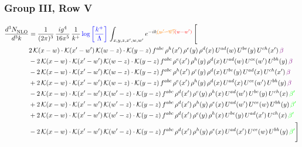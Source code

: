 \documentclass[9pt]{article}
\numberwithin{equation}{section}
\begin{document}
\subsubsection{Group III, Row V}     
\begin{align}
     \frac{d^{3}N_{\rm NLO}^{\rm}}{d^{3}k}  & = \frac{1}{(2\pi)^{3}}\, \frac{ig^{4}}{16\pi^{5}}\, \frac{1}{k^{+}}\, {\color{blue}\log{\left[\frac{k^{+}}{\Lambda}\right]}}\,\int_{x,y,z,x^{\prime},w,w^{\prime}}e^{-ik{\color{orange}\cancel{(w^{\prime}-w)}}{\color{red}(w-w^{\prime})}}\, \Bigg[\notag \\ & 2\,\mathcal{K}(x-w)\cdot\mathcal{K}(x'-w')\,\mathcal{K}(w-z)\cdot\mathcal{K}(y-z)\, f^{abc}\,\rho^{h}(x')\,\rho^{e}(y)\,\rho^{d}(x)\,U^{ad}(w)\,U^{be}(y)\,U^{ch}(x')\,{\color{violet}\beta}\notag\\ &-2\,\mathcal{K}(x-w)\cdot\mathcal{K}(x'-w')\,\mathcal{K}(w-z)\cdot\mathcal{K}(y-z)\, f^{abc}\,\rho^{e}(x')\,\rho^{h}(y)\,\rho^{d}(x)\,U^{ad}(w)\,U^{ce}(w')\,U^{bh}(y)\,{\color{violet}\beta} \notag\\ & -2\,\mathcal{K}(x-w)\cdot\mathcal{K}(x'-w')\,\mathcal{K}(w-z)\cdot\mathcal{K}(y-z)\, f^{abc}\,\rho^{h}(x')\,\rho^{e}(y)\,\rho^{d}(x)\,U^{be}(y)\,U^{ad}(x)\,U^{ch}(x')\,{\color{violet}\beta} \notag\\ &+2\,\mathcal{K}(x-w)\cdot\mathcal{K}(x'-w')\,\mathcal{K}(w-z)\cdot\mathcal{K}(y-z)\, f^{abc}\,\rho^{e}(x')\,\rho^{h}(y)\,\rho^{d}(x)\,U^{ad}(x)\,U^{ce}(w')\,U^{bh}(y)\,{\color{violet}\beta}\notag \\ & -2\, \mathcal{K}(x-w) \cdot \mathcal{K}(x'-w')\, \mathcal{K}(w'-z) \cdot \mathcal{K}(y-z)\, f^{abc}\, \rho^{d}(x')\,\rho^{e}(y)\, \rho^{h}(x)\,U^{ad}(w')\,U^{be}(y)\,U^{ch}(x)\, {\color{green} \beta'}\notag \\ & + 2\, \mathcal{K}(x-w) \cdot \mathcal{K}(x'-w')\, \mathcal{K}(w'-z) \cdot \mathcal{K}(y-z)\, f^{abc}\, \rho^{d}(x')\,\rho^{h}(y)\, \rho^{e}(x)\,U^{ad}(w')\,U^{ce}(w)\,U^{bh}(y)\, {\color{green} \beta'}\notag \\ & +2\, \mathcal{K}(x-w) \cdot \mathcal{K}(x'-w')\, \mathcal{K}(w'-z) \cdot \mathcal{K}(y-z)\, f^{abc}\, \rho^{d}(x')\,\rho^{e}(y)\, \rho^{h}(x)\,U^{be}(y)\,U^{ad}(x')\,U^{ch}(x)\, {\color{green} \beta'}\notag \\ & -2\, \mathcal{K}(x-w) \cdot \mathcal{K}(x'-w')\, \mathcal{K}(w'-z) \cdot \mathcal{K}(y-z)\, f^{abc}\, \rho^{d}(x')\,\rho^{h}(y)\, \rho^{e}(x)\,U^{ad}(x')\,U^{ce}(w)\,U^{bh}(y)\, {\color{green} \beta'}\Bigg]
     \end{align} 
\end{document}
